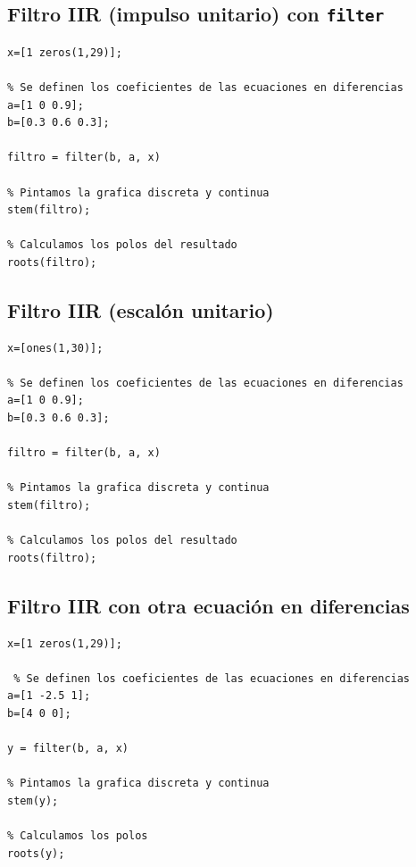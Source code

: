 \documentclass[11pt,a4paper]{article}
\begin{document}
\subsection{Filtro IIR (impulso unitario) con \texttt{filter}}
\label{code2}

\begin{lstlisting}[frame=single]
% Se define el array con los pulsos
x=[1 zeros(1,29)];

% Se definen los coeficientes de las ecuaciones en diferencias
a=[1 0 0.9];
b=[0.3 0.6 0.3];

filtro = filter(b, a, x)

% Pintamos la grafica discreta y continua
stem(filtro);

% Calculamos los polos del resultado
roots(filtro);
\end{lstlisting}

\subsection{Filtro IIR (escalón unitario)}
\label{code3}

\begin{lstlisting}[frame=single]
% Se define el array con los pulsos
x=[ones(1,30)];

% Se definen los coeficientes de las ecuaciones en diferencias
a=[1 0 0.9];
b=[0.3 0.6 0.3];

filtro = filter(b, a, x)

% Pintamos la grafica discreta y continua
stem(filtro);

% Calculamos los polos del resultado
roots(filtro);
\end{lstlisting}

\subsection{Filtro IIR con otra ecuación en diferencias}
\label{code4}

\begin{lstlisting}[frame=single]
% Se define el array con los pulsos
x=[1 zeros(1,29)];

 % Se definen los coeficientes de las ecuaciones en diferencias
a=[1 -2.5 1];
b=[4 0 0];

y = filter(b, a, x)

% Pintamos la grafica discreta y continua
stem(y);

% Calculamos los polos
roots(y);
\end{lstlisting}
\end{document}
